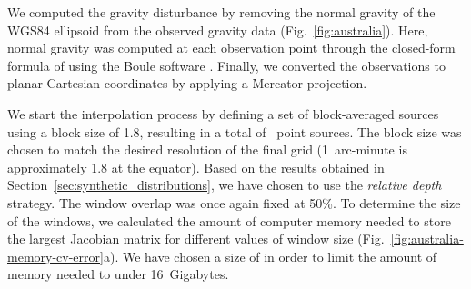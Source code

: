 We computed the gravity disturbance by removing the normal gravity of
the WGS84 ellipsoid from the observed gravity data (Fig.~\ref{fig:australia}).
Here, normal gravity was computed at each observation point through the
closed-form formula of \citet{ligotze2001} using the Boule software
\citep{boule2020}.
Finally, we converted the observations to planar Cartesian coordinates by
applying a Mercator projection.

We start the interpolation process by defining a set of block-averaged sources
using a block size of 1.8\km{}, resulting in a total of
\AustraliaEqlNSources{}~point sources.
The block size was chosen to match the desired resolution of the final grid
(1~arc-minute is approximately 1.8\km{} at the equator).
Based on the results obtained in Section~\ref{sec:synthetic_distributions}, we
have chosen to use the \emph{relative depth} strategy.
The window overlap was once again fixed at 50\%.
To determine the size of the windows, we calculated the amount of computer memory
needed to store the largest Jacobian matrix for different values of window size
(Fig.~\ref{fig:australia-memory-cv-error}a).
We have chosen a size of \AustraliaEqlWindowSize{} in order to limit the
amount of memory needed to under 16~Gigabytes.

